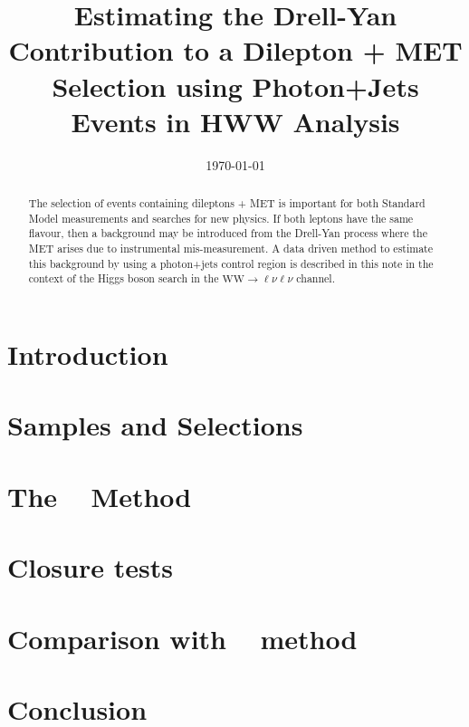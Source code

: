 \documentclass{cmspaper}
\begin{document}
\begin{titlepage}


  \date{\today}

  \title{Estimating the Drell-Yan Contribution to a Dilepton + MET Selection using Photon+Jets Events
  in HWW Analysis}
  
  

  \begin{abstract}
The selection of events containing dileptons + MET is important for both Standard Model measurements and searches for new physics. If both leptons have the same flavour, then a background may be introduced from the Drell-Yan process where the MET arises due to instrumental mis-measurement.  A data driven method to estimate this background by using a photon+jets control region is described in this note in the context of the Higgs boson search in the {$\mathrm{WW}\rightarrow\ell\nu\ell\nu$} channel.
   \end{abstract} 

\end{titlepage}
\tableofcontents
\listoftables
\listoffigures
\newpage 

\section{Introduction}
   \label{sec:introduction}
   
\section{Samples and Selections}
  \label{sec:datasets}
  
\section{The \zm~ Method}
   \label{sec:method}
   
\section{Closure tests}
   \label{sec:closure}
   
\section{Comparison with \routin~ method}
   \label{sec:comparison}
   
\section{Conclusion}
   
\clearpage

\end{document}
